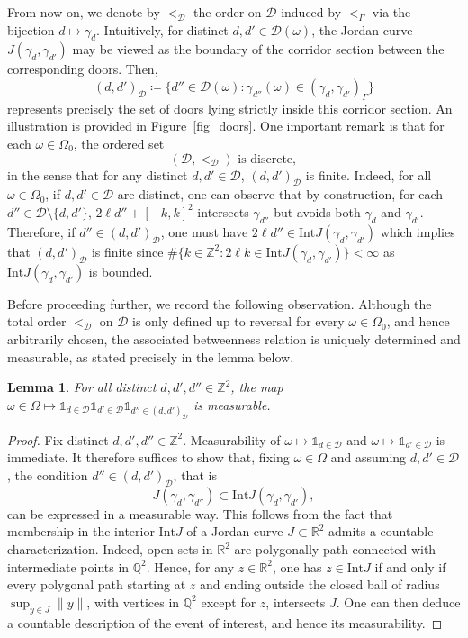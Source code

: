 \documentclass[a4paper, 11pt]{article} %
\theoremstyle{plain}
\newtheorem{lemma}[theorem]{Lemma}
\newcommand{\Int}{\mathrm{Int}}
\newcommand{\clInt}{\overline{\mathrm{Int}}}
\newcommand{\D}{\mathcal D}
\newcommand{\R}{\mathbb{R}}
\newcommand{\Q}{\mathbb{Q}}
\newcommand{\Z}{\mathbb{Z}}
\newcommand{\1}{\mathds 1}
\numberwithin{equation}{section}
\begin{document}
From now on, we denote by $<_\D$ the order on $\D$ induced by $<_\Gamma$ via the bijection $d\mapsto\gamma_d$. Intuitively, for distinct $d,d'\in\D(\omega)$, the Jordan curve $J(\gamma_d,\gamma_{d'})$ may be viewed as the boundary of the corridor section between the corresponding doors. Then, 
    \[(d,d')_\D\coloneqq\{d''\in\D(\omega):\gamma_{d''}(\omega)\in(\gamma_d,\gamma_{d'})_\Gamma\}\]
represents precisely the set of doors lying strictly inside this corridor section. An illustration is provided in Figure~\ref{fig_doors}. One important remark is that for each $\omega\in\Omega_0$, the ordered set
    \[\text{$(\D,<_\D)$ is discrete},\]
in the sense that for any distinct $d,d'\in\D$, $(d,d')_\D$ is finite. Indeed, for all $\omega\in\Omega_0$, if $d,d'\in\D$ are distinct, one can observe that by construction, for each $d''\in\D\setminus\{d,d'\}$, $2\ell d''+[-k,k]^2$ intersects $\gamma_{d''}$ but avoids both $\gamma_d$ and $\gamma_{d'}$. Therefore, if $d''\in(d, d')_\D$, one must have $2\ell d''\in\Int J(\gamma_d, \gamma_{d'})$ which implies that $(d,d')_\D$ is finite since $\#\{k\in\Z^2:2\ell k\in\Int J(\gamma_d, \gamma_{d'})\}<\infty$ as $\Int J(\gamma_d, \gamma_{d'})$ is bounded. 

Before proceeding further, we record the following observation. Although the total order $<_\D$ on $\D$ is only defined up to reversal for every $\omega\in\Omega_0$, and hence arbitrarily chosen, the associated betweenness relation is uniquely determined and measurable, as stated precisely in the lemma below.


\begin{lemma}
    \label{lemma_measurable}
    For all distinct $d,d',d''\in\Z^2$, the map $\omega\in\Omega\mapsto\1_{d\in\D}\1_{d'\in\D}\1_{d''\in(d,d')_\D}$ is measurable.
\end{lemma}


\begin{proof}
    Fix distinct $d,d',d''\in\Z^2$. Measurability of $\omega\mapsto\1_{d\in\D}$ and $\omega\mapsto\1_{d'\in\D}$ is immediate. It therefore suffices to show that, fixing $\omega\in\Omega$ and assuming $d,d'\in\D$, the condition $d''\in(d,d')_\D$, that is
        \[J(\gamma_d,\gamma_{d''})\subset\clInt J(\gamma_d,\gamma_{d'}),\]
    can be expressed in a measurable way. This follows from the fact that membership in the interior $\Int J$ of a Jordan curve $J\subset\R^2$ admits a countable characterization. Indeed, open sets in $\R^2$ are polygonally path connected with intermediate points in $\Q^2$. Hence, for any $z\in\R^2$, one has $z\in\Int J$ if and only if every polygonal path starting at $z$ and ending outside the closed ball of radius $\sup_{y\in J}\|y\|$, with vertices in $\Q^2$ except for $z$, intersects $J$. One can then deduce a countable description of the event of interest, and hence its measurability.
\end{proof}
\end{document}
